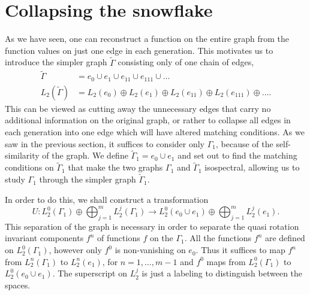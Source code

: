 




\section{Collapsing the snowflake}

As we have seen, one can reconstruct a function on the entire graph from the function values on just one edge in each generation. This motivates us to introduce the simpler graph $\widetilde{\Gamma}$ consisting only of one chain of edges,
\begin{align*}
  \widetilde{\Gamma} &= e_0 \cup e_1 \cup e_{11} \cup e_{111} \cup \ldots \\
  L_2(\widetilde{\Gamma}) &= L_2(e_0) \oplus L_2(e_1) \oplus L_2(e_{11}) \oplus L_2(e_{111}) \oplus \ldots.
\end{align*}
This can be viewed as cutting away the unnecessary edges that carry no additional information on the original graph, or rather to collapse all edges in each generation into one edge which will have altered matching conditions. As we saw in the previous section, it suffices to consider only $\Gamma_1$, because of the self-similarity of the graph. We define $\widetilde{\Gamma}_1 = e_0 \cup e_1$ and set out to find the matching conditions on $\widetilde{\Gamma}_1$ that make the two graphs $\Gamma_1$ and $\widetilde{\Gamma}_1$ isospectral, allowing us to study $\Gamma_1$ through the simpler graph $\widetilde{\Gamma}_1$.

In order to do this, we shall construct a transformation
\[
  U : L^0_2(\Gamma_1) \oplus \bigoplus_{j=1}^m L^j_2(\Gamma_1) \to
      L^0_2(e_0\cup e_1) \oplus \bigoplus_{j=1}^m L^j_2(e_1).
\]
This separation of the graph is necessary in order to separate the quasi rotation invariant components $f^n$ of functions $f$ on the $\Gamma_1$. All the functions $f^n$ are defined on $L^0_2(\Gamma_1)$, however only $f^0$ is non-vanishing on $e_0$. Thus it suffices to map $f^n$ from $L_2^n(\Gamma_1)$ to $L_2^n(e_1)$, for $n=1,\ldots,m-1$ and $f^0$ maps from $L^0_2(\Gamma_1)$ to $L^0_2(e_0 \cup e_1)$. The superscript on $L_2^j$ is just a labeling to distinguish between the spaces.

